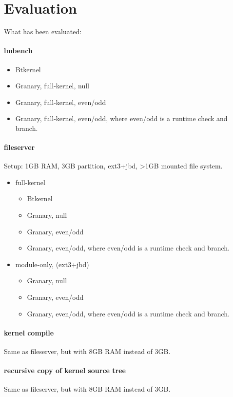 \documentclass[preprint]{sigplanconf}
\begin{document}
\section{Evaluation}\label{sec:eval}

What has been evaluated:

\paragraph{lmbench}
\begin{itemize}
	\item Btkernel
	\item Granary, full-kernel, null
	\item Granary, full-kernel, even/odd
	\item Granary, full-kernel, even/odd, where even/odd is a runtime check and branch.
\end{itemize}

\paragraph{fileserver}
Setup: 1GB RAM, 3GB partition, ext3+jbd, >1GB mounted file system.
\begin{itemize}
	\item full-kernel
	\begin{itemize}
		\item Btkernel
		\item Granary, null
		\item Granary, even/odd
		\item Granary, even/odd, where even/odd is a runtime check and branch.
	\end{itemize}
	\item module-only, (ext3+jbd)
	\begin{itemize}
		\item Granary, null
		\item Granary, even/odd
		\item Granary, even/odd, where even/odd is a runtime check and branch.
	\end{itemize}
\end{itemize}

\paragraph{kernel compile}
Same as fileserver, but with 8GB RAM instead of 3GB.

\paragraph{recursive copy of kernel source tree}
Same as fileserver, but with 8GB RAM instead of 3GB.
\end{document}
